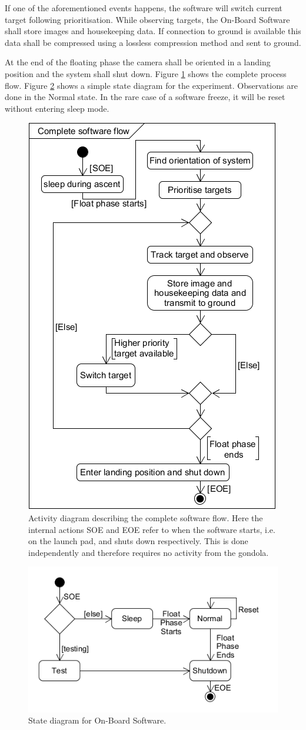 If one of the aforementioned events happens, the software will switch current target following prioritisation. While observing targets, the On-Board Software shall store images and housekeeping data. If connection to ground is available this data shall be compressed using a lossless compression method and sent to ground.

At the end of the floating phase the camera shall be oriented in a landing position and the system shall shut down. Figure \ref{fig:software-activity-diagram} shows the complete process flow. Figure \ref{fig:software-state-diagram} shows a simple state diagram for the experiment. Observations are done in the Normal state. In the rare case of a software freeze, it will be reset without entering sleep mode.

\begin{figure}[H]
    \centering
    \includegraphics[width=.5\textwidth]{4-experiment-design/img/software/activity-diagram.png}
    \caption{Activity diagram describing the complete software flow. Here the internal actions SOE and EOE refer to when the software starts, i.e. on the launch pad, and shuts down respectively. This is done independently and therefore requires no activity from the gondola.}
    \label{fig:software-activity-diagram}
\end{figure}

\begin{figure}[H]
	\centering
	\includegraphics[width=.7\textwidth]{4-experiment-design/img/software/state-diagram.png}
	\caption{State diagram for On-Board Software.}
	\label{fig:software-state-diagram}
\end{figure}

